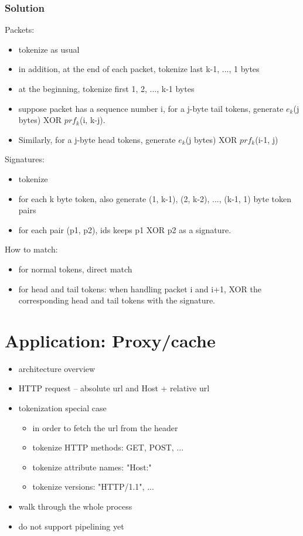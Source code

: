 \subsubsection{Solution}
Packets:
\begin{itemize}
\item tokenize as usual
\item in addition, at the end of each packet, tokenize last k-1, ..., 1 bytes
\item at the beginning, tokenize first 1, 2, ..., k-1 bytes
\item suppose packet has a sequence number i, for a j-byte tail tokens, generate $e_k$(j bytes) XOR $prf_k$(i, k-j).
\item Similarly, for a j-byte head tokens, generate $e_k$(j bytes) XOR $prf_k$(i-1, j)
\end{itemize}

Signatures:
\begin{itemize}
\item tokenize
\item for each k byte token, also generate (1, k-1), (2, k-2), ..., (k-1, 1) byte token pairs
\item for each pair (p1, p2), ids keeps p1 XOR p2 as a signature.
\end{itemize}

How to match:
\begin{itemize}
\item for normal tokens, direct match
\item for head and tail tokens: when handling packet i and i+1, XOR the corresponding head and tail tokens with the signature.
\end{itemize}

\section{Application: Proxy/cache}\label{sec:proxy}
\begin{itemize}
\item architecture overview
\item HTTP request -- absolute url and Host + relative url
\item tokenization special case \\
    \begin{itemize}
    \item in order to fetch the url from the header
    \item tokenize HTTP methods: GET, POST, ...
    \item tokenize attribute names: "Host:"
    \item tokenize versions: "HTTP/1.1", ...
    \end{itemize}
\item walk through the whole process
\item do not support pipelining yet
\end{itemize}


